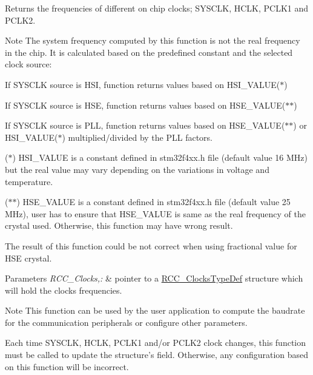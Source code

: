 Returns the frequencies of different on chip clocks; S\-Y\-S\-C\-L\-K, H\-C\-L\-K, P\-C\-L\-K1 and P\-C\-L\-K2. 

\begin{DoxyNote}{Note}
The system frequency computed by this function is not the real frequency in the chip. It is calculated based on the predefined constant and the selected clock source\-: 

If S\-Y\-S\-C\-L\-K source is H\-S\-I, function returns values based on H\-S\-I\-\_\-\-V\-A\-L\-U\-E($\ast$) 

If S\-Y\-S\-C\-L\-K source is H\-S\-E, function returns values based on H\-S\-E\-\_\-\-V\-A\-L\-U\-E($\ast$$\ast$) 

If S\-Y\-S\-C\-L\-K source is P\-L\-L, function returns values based on H\-S\-E\-\_\-\-V\-A\-L\-U\-E($\ast$$\ast$) or H\-S\-I\-\_\-\-V\-A\-L\-U\-E($\ast$) multiplied/divided by the P\-L\-L factors. 

($\ast$) H\-S\-I\-\_\-\-V\-A\-L\-U\-E is a constant defined in stm32f4xx.\-h file (default value 16 M\-Hz) but the real value may vary depending on the variations in voltage and temperature. 

($\ast$$\ast$) H\-S\-E\-\_\-\-V\-A\-L\-U\-E is a constant defined in stm32f4xx.\-h file (default value 25 M\-Hz), user has to ensure that H\-S\-E\-\_\-\-V\-A\-L\-U\-E is same as the real frequency of the crystal used. Otherwise, this function may have wrong result.

The result of this function could be not correct when using fractional value for H\-S\-E crystal.
\end{DoxyNote}

\begin{DoxyParams}{Parameters}
{\em R\-C\-C\-\_\-\-Clocks,\-:} & pointer to a \hyperlink{struct_r_c_c___clocks_type_def}{R\-C\-C\-\_\-\-Clocks\-Type\-Def} structure which will hold the clocks frequencies.\\
\hline
\end{DoxyParams}
\begin{DoxyNote}{Note}
This function can be used by the user application to compute the baudrate for the communication peripherals or configure other parameters. 

Each time S\-Y\-S\-C\-L\-K, H\-C\-L\-K, P\-C\-L\-K1 and/or P\-C\-L\-K2 clock changes, this function must be called to update the structure's field. Otherwise, any configuration based on this function will be incorrect.
\end{DoxyNote}

